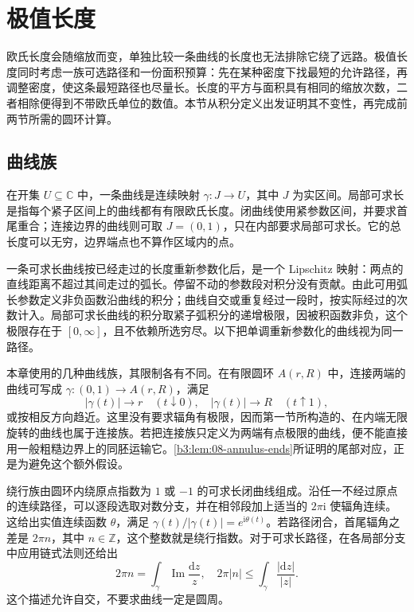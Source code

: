 \section{极值长度}
\label{b3:sec:0803}

欧氏长度会随缩放而变，单独比较一条曲线的长度也无法排除它绕了远路。极值长度同时考虑一族可选路径和一份面积预算：先在某种密度下找最短的允许路径，再调整密度，使这条最短路径也尽量长。长度的平方与面积具有相同的缩放次数，二者相除便得到不带欧氏单位的数值。本节从积分定义出发证明其不变性，再完成前两节所需的圆环计算。

\subsection{曲线族}
\label{b3:subsec:080301}

在开集 \(U\subseteq\mathbb C\) 中，一条曲线是连续映射 \(\gamma:J\rightarrow U\)，其中 \(J\) 为实区间。局部可求长是指每个紧子区间上的曲线都有有限欧氏长度。闭曲线使用紧参数区间，并要求首尾重合；连接边界的曲线则可取 \(J=(0,1)\)，只在内部要求局部可求长。它的总长度可以无穷，边界端点也不算作区域内的点。

\ProseParagraphBreak
一条可求长曲线按已经走过的长度重新参数化后，是一个 Lipschitz 映射：两点的直线距离不超过其间走过的弧长。停留不动的参数段对积分没有贡献。由此可用弧长参数定义非负函数沿曲线的积分；曲线自交或重复经过一段时，按实际经过的次数计入。局部可求长曲线的积分取紧子弧积分的递增极限，因被积函数非负，这个极限存在于 \([0,\infty]\)，且不依赖所选穷尽。以下把单调重新参数化的曲线视为同一路径。

\ProseParagraphBreak
本章使用的几种曲线族，其限制各有不同。在有限圆环 \(A(r,R)\) 中，连接两端的曲线可写成 \(\gamma:(0,1)\rightarrow A(r,R)\)，满足
\[
 |\gamma(t)|\longrightarrow r\quad(t\downarrow0),\quad
 |\gamma(t)|\longrightarrow R\quad(t\uparrow1),
\]
或按相反方向趋近。这里没有要求辐角有极限，因而第一节所构造的、在内端无限旋转的曲线也属于连接族。若把连接族只定义为两端有点极限的曲线，便不能直接用一般粗糙边界上的同胚运输它。\cref{b3:lem:08-annulus-ends}所证明的尾部对应，正是为避免这个额外假设。

\ProseParagraphBreak
绕行族由圆环内绕原点指数为 \(1\) 或 \(-1\) 的可求长闭曲线组成。沿任一不经过原点的连续路径，可以逐段选取对数分支，并在相邻段加上适当的 \(2\pi\mathrm i\) 使辐角连续。这给出实值连续函数 \(\theta\)，满足 \(\gamma(t)/|\gamma(t)|=e^{\mathrm i\theta(t)}\)。若路径闭合，首尾辐角之差是 \(2\pi n\)，其中 \(n\in\mathbb Z\)，这个整数就是绕行指数。对于可求长路径，在各局部分支中应用链式法则还给出
\[
 2\pi n=\int_\gamma\operatorname{Im}\frac{\mathrm dz}{z},\quad
 2\pi|n|\le\int_\gamma\frac{|\mathrm dz|}{|z|}.
\]
这个描述允许自交，不要求曲线一定是圆周。

